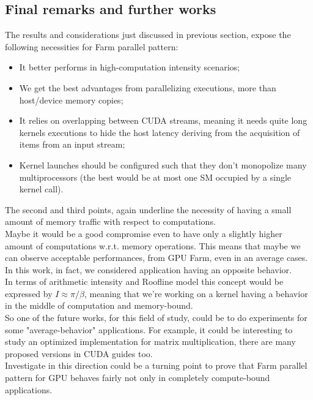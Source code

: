 \subsection{Final remarks and further works}
The results and considerations just discussed in previous section, expose the following necessities for Farm parallel pattern: 
\begin{itemize}
	\item It better performs in high-computation intensity scenarios;
	\item We get the best advantages from parallelizing executions, more than host/device memory copies;
	\item It relies on overlapping between CUDA streams, meaning it needs quite long kernels executions to hide the host latency deriving from the acquisition of items from an input stream;
	\item Kernel launches should be configured such that they don't monopolize many multiprocessors (the best would be at most one SM occupied by a single kernel call). 
\end{itemize}
The second and third points, again underline the necessity of having a small amount of memory traffic with respect to computations.\\
Maybe it would be a good compromise even to have only a slightly higher amount of computations w.r.t. memory operations.
This means that maybe we can observe acceptable performances, from GPU Farm, even in an average cases.\\
In this work, in fact, we considered application having an opposite behavior.\\
In terms of arithmetic intensity and Roofline model this concept would be expressed by \( I \approx \pi /\beta \), meaning that we're working on a kernel having a behavior in the middle of computation and memory-bound.\\
So one of the future works, for this field of study, could be to do experiments for some "average-behavior" applications.
For example, it could be interesting to study an optimized implementation for matrix multiplication, there are many proposed versions in CUDA guides too\cite{cudabestpractices,cudaguide}.\\
Investigate in this direction could be a turning point to prove that Farm parallel pattern for GPU behaves fairly not only in completely compute-bound applications.\\

